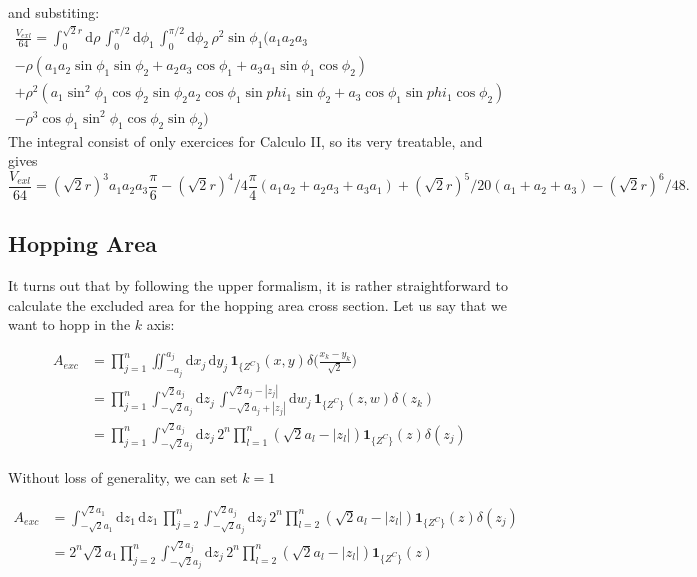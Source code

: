 \documentclass[superscriptaddress,pre,reprint,showpacs,onecolumn]{revtex4-1}
\newcommand{\rd}[1]{\mathrm{d}{#1} \,}
\newcommand{\indicatorsymbol}{\mathbf{1}}
\newcommand{\indicator}[1]{\indicatorsymbol_{ \{   #1 \} } }
\begin{document}
and substiting:
  \begin{multline}
  \frac{V_{exl}}{64}= \int_0^{\sqrt{2}r} \rd{\rho}
  \int_0^{\pi/2} \rd{\phi_1}   \int_0^{\pi/2} \rd{\phi_2}
  \rho^2 \sin\phi_1
  \bigg( a_1 a_2 a_3 \\
  -\rho ( a_1 a_2 \sin \phi_1 \sin \phi_2
  +a_2 a_3 \cos \phi_1 + a_3 a_1 \sin \phi_1 \cos \phi_2) \\
  +\rho^2( a_1 \sin^2\phi_1 \cos\phi_2 \sin\phi_2 
  a_2 \cos \phi_1 \sin phi_1 \sin\phi_2 
  + a_3 \cos \phi_1 \sin phi_1 \cos \phi_2 ) \\
  -\rho^3  \cos\phi_1 \sin^2\phi_1 \cos\phi_2 \sin\phi_2 
  \bigg)
   \end{multline}
The integral consist of only exercices for Calculo II, so its very treatable, and gives
\begin{equation}
  \frac{V_{exl}}{64}=
  (\sqrt{2} r)^3 a_1 a_2 a_3 \frac{\pi}{6}
  -(\sqrt{2}r)^4/4 \frac{\pi}{4} (a_1 a_2 +a_2 a_3 + a_3 a_1)
  + (\sqrt{2}r)^5/20 (a_1 + a_2 + a_3)
  -(\sqrt{2}r)^6/48.
\end{equation}

\subsection{Hopping Area}

It turns out that by following the upper formalism, it is rather
straightforward to calculate the excluded area for the hopping area
cross section. Let us say that we want to hopp in the $k$ axis:

\begin{equation}
  \begin{split}
    A_{exc} 
   &  =  \prod_{j=1}^n \iint_{-a_j}^{a_j} \rd{x_j} \rd{y_j} \indicator{Z^C} (x,y)
    \delta \big(\frac{x_k-y_k}{\sqrt{2}}\big) \\
    &  =  \prod_{j=1}^n \int_{-\sqrt{2} a_j}^{\sqrt{2}a_j} \rd{z_j}
\int_{-\sqrt{2} a_j+|z_j|}^{\sqrt{2}a_j-|z_j|} \rd{w_j}
 \indicator{Z^C} (z,w)
    \delta (z_k) \\
        &  =  \prod_{j=1}^n \int_{-\sqrt{2} a_j}^{\sqrt{2}a_j} \rd{z_j}
2^n \prod_{l=1}^n (\sqrt{2}a_l-|z_l|)
 \indicator{Z^C} (z)
    \delta (z_j) 
  \end{split}
\end{equation}

Without loss of generality, we can set $k=1$

\begin{equation}
  \begin{split}
    A_{exc} &=  \int_{-\sqrt{2}a_1}^{\sqrt{2}a_1} \rd{z_1} \rd{z_1}
    \prod_{j=2}^n \int_{-\sqrt{2} a_j}^{\sqrt{2}a_j} \rd{z_j}
    2^n \prod_{l=2}^n (\sqrt{2}a_l-|z_l|)
    \indicator{Z^C} (z)
    \delta (z_j) \\
    &= 2^n\sqrt{2}a_1    \prod_{j=2}^n \int_{-\sqrt{2} a_j}^{\sqrt{2}a_j} \rd{z_j}
    2^n \prod_{l=2}^n (\sqrt{2}a_l-|z_l|)
    \indicator{Z^C} (z)    
  \end{split}
\end{equation}
\end{document}
